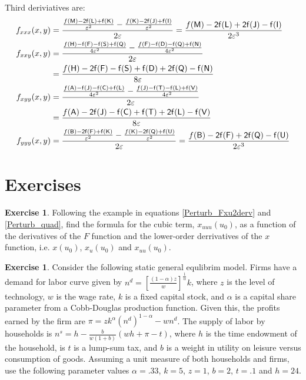 \documentclass[letterpaper,12pt]{article}
\newcommand{\ve}{\varepsilon}
\theoremstyle{definition}
\newtheorem{exercise}[theorem]{Exercise}
\begin{document}
\begin{spacing}{1.5}
		Third deriviatives are:
		\begin{align}
			f_{xxx}(x,y) & = \frac{\frac{f(\sf M)-2f(\sf L)+f(\sf K)}{\ve^2} - \frac{f(\sf K)-2f(\sf J)+f(\sf I)}{\ve^2}}{2\ve} =\frac{f(\sf M)-2f(\sf L)+2f(\sf J)-f(\sf I)}{2\ve^3} \nonumber \\
			f_{xxy}(x,y) & = \frac{\frac{f(\sf H)-f(\sf F)-f(\sf S)+f(\sf Q)}{4\ve^2} - \frac{f(\sf F)-f(\sf D)-f(\sf Q)+f(\sf N)}{4\ve^2}}{2\ve} \nonumber \\
			             & = \frac{f(\sf H)-2f(\sf F)-f(\sf S)+f(\sf D)+2f(\sf Q)-f(\sf N)}{8\ve} \nonumber \\
			f_{xyy}(x,y)& = \frac{\frac{f(\sf A)-f(\sf J)-f(\sf C)+f(\sf L)}{4\ve^2} - \frac{f(\sf J)-f(\sf T)-f(\sf L)+f(\sf V)}{4\ve^2}}{2\ve} \nonumber \\
			             & = \frac{f(\sf A)-2f(\sf J)-f(\sf C)+f(\sf T)+2f(\sf L)-f(\sf V)}{8\ve} \nonumber \\
			f_{yyy}(x,y) & = \frac{\frac{f(\sf B)-2f(\sf F)+f(\sf K)}{\ve^2} - \frac{f(\sf K)-2f(\sf Q)+f(\sf U)}{\ve^2}}{2\ve} =\frac{f(\sf B)-2f(\sf F)+2f(\sf Q)-f(\sf U)}{2\ve^3} \nonumber
		\end{align}



\newpage
\section*{Exercises}\label{Perturb_HW} 

	\begin{exercise} \label{Perturb_HW_Cubic}
		Following the example in equations \eqref{Perturb_Fxu2derv} and \eqref{Perturb_quad}, find the formula for the cubic term, $x_{uuu}(u_0)$, as a function of the derivatives of the $F$ function and the lower-order derrivatives of the $x$ function, i.e. $x(u_0)$, $x_u(u_0)$ and $x_{uu}(u_0)$.
	\end{exercise}

	\begin{exercise} \label{Perturb_HW02_GEApprox}
		Consider the following static general equlibrim model.  Firms have a demand for labor curve given by $n^d = \left[\frac{(1-\alpha)z}{w}\right]^{\tfrac{1}{\alpha}} k$, where $z$ is the level of technology, $w$ is the wage rate, $k$ is a fixed capital stock, and $\alpha$ is a capital share parameter from a Cobb-Douglas production function.  Given this, the profits earned by the firm are $\pi = zk^\alpha (n^d)^{1-\alpha} - w n^d$.  The supply of labor by households is $n^s = h - \frac{b}{w(1+b)}(wh+\pi-t)$, where $h$ is the time endowment of the household, is $t$ is a lump-sum tax, and $b$ is a weight in utility on leisure versus consumption of goods.  Assuming a unit measure of both households and firms, use the following parameter values $\alpha = .33$, $k=5$, $z=1$, $b=2$, $t=.1$ and $h=24$.


\end{exercise}
\end{spacing}
\end{document}

